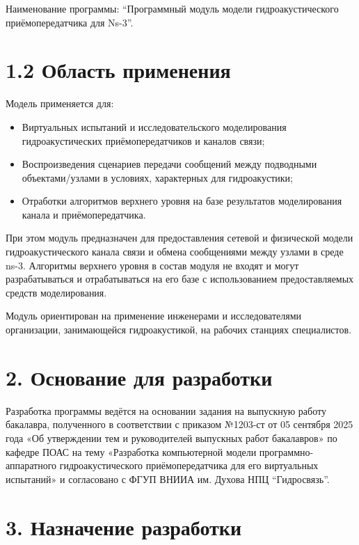 Наименование программы: ``Программный модуль модели гидроакустического
приёмопередатчика для Ns-3''.

\section{1.2 Область
применения}\label{ux43eux431ux43bux430ux441ux442ux44c-ux43fux440ux438ux43cux435ux43dux435ux43dux438ux44f}

Модель применяется для:

\begin{itemize}
\item
  Виртуальных испытаний и исследовательского моделирования
  гидроакустических приёмопередатчиков и каналов связи;
\item
  Воспроизведения сценариев передачи сообщений между подводными
  объектами/узлами в условиях, характерных для гидроакустики;
\item
  Отработки алгоритмов верхнего уровня на базе результатов моделирования
  канала и приёмопередатчика.
\end{itemize}

При этом модуль предназначен для предоставления сетевой и физической
модели гидроакустического канала связи и обмена сообщениями между узлами
в среде ns-3. Алгоритмы верхнего уровня в состав модуля не входят и
могут разрабатываться и отрабатываться на его базе с использованием
предоставляемых средств моделирования.

Модуль ориентирован на применение инженерами и исследователями
организации, занимающейся гидроакустикой, на рабочих станциях
специалистов.

\section{2. Основание для
разработки}\label{ux43eux441ux43dux43eux432ux430ux43dux438ux435-ux434ux43bux44f-ux440ux430ux437ux440ux430ux431ux43eux442ux43aux438}

Разработка программы ведётся на основании задания на выпускную работу
бакалавра, полученного в соответствии с приказом №1203-ст от 05 сентября
2025 года «Об утверждении тем и руководителей выпускных работ
бакалавров» по кафедре ПОАС на тему «Разработка компьютерной модели
программно-аппаратного гидроакустического приёмопередатчика для его
виртуальных испытаний» и согласовано с ФГУП ВНИИА им. Духова НПЦ
``Гидросвязь''.

\section{3. Назначение
разработки}\label{ux43dux430ux437ux43dux430ux447ux435ux43dux438ux435-ux440ux430ux437ux440ux430ux431ux43eux442ux43aux438}

